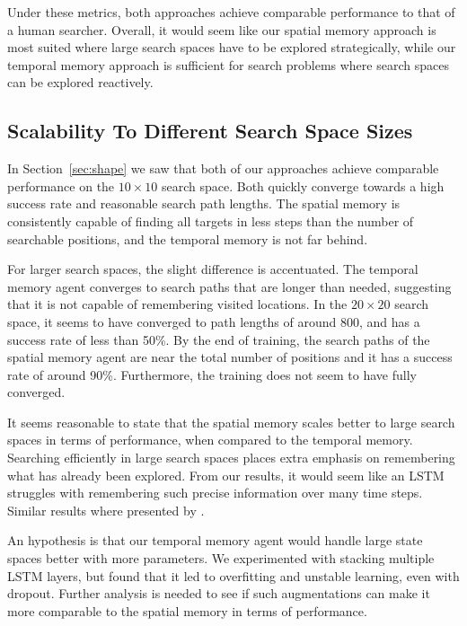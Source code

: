 Under these metrics, both approaches achieve comparable performance to that of a human searcher. 
Overall, it would seem like our spatial memory approach is most suited where large search spaces have to be explored strategically, while our temporal memory approach is sufficient for search problems where search spaces can be explored reactively.

\subsection{Scalability To Different Search Space Sizes}

In Section~\ref{sec:shape} we saw that both of our approaches achieve comparable performance on the \(10 \times 10\) search space.
Both quickly converge towards a high success rate and reasonable search path lengths.
The spatial memory is consistently capable of finding all targets in less steps than the number of searchable positions, and the temporal memory is not far behind.

For larger search spaces, the slight difference is accentuated.
The temporal memory agent converges to search paths that are longer than needed, suggesting that it is not capable of remembering visited locations.
In the \(20 \times 20\) search space, it seems to have converged to path lengths of around 800, and has a success rate of less than 50\%.
By the end of training, the search paths of the spatial memory agent are near the total number of positions and it has a success rate of around 90\%.
Furthermore, the training does not seem to have fully converged.

It seems reasonable to state that the spatial memory scales better to large search spaces in terms of performance, when compared to the temporal memory.
Searching efficiently in large search spaces places extra emphasis on remembering what has already been explored.
From our results, it would seem like an LSTM struggles with remembering such precise information over many time steps.
Similar results where presented by \cite{oh_control_2016}.

An hypothesis is that our temporal memory agent would handle large state spaces better with more parameters.
We experimented with stacking multiple LSTM layers, but found that it led to overfitting and unstable learning, even with dropout.
Further analysis is needed to see if such augmentations can make it more comparable to the spatial memory in terms of performance.

